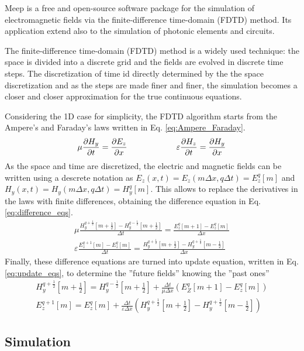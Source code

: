 Meep is a free and open-source software package for the simulation of electromagnetic fields via the finite-difference time-domain (FDTD) method.
Its application extend also to the simulation of photonic elements and circuits.  

The finite-difference time-domain (FDTD) method is a widely used technique: the space is divided into a discrete grid and the fields are evolved in discrete time steps.
The discretization of time id directly determined by the the space discretization and as the steps are made finer and finer, the simulation becomes a closer and closer approximation for the true continuous equations.

Considering the 1D case for simplicity, the FDTD algorithm starts from the Ampere's and Faraday's laws written in Eq. \ref*{eq:Ampere_Faraday}.
\begin{equation} \label{eq:Ampere_Faraday}
    \mu \pdv{H_y}{t} = \pdv{E_z}{x} \qquad\qquad\qquad \varepsilon \pdv{H_z}{t} = \pdv{H_y}{x}
\end{equation}
As the space and time are discretized, the electric and magnetic fields can be written using a descrete notation as \(E_z(x, t) = E_z (m\Delta x, q \Delta t) = E_z^q[m]\) and \(H_y(x, t) = H_y(m\Delta x, q \Delta t) = H_y^q[m]\). This allows to replace the derivatives in the laws with finite differences, obtaining the difference equation in Eq. \ref*{eq:difference_eqs}.
\begin{align}\label{eq:difference_eqs}
    \mu \frac{H_y^{q+\frac{1}{2}}[m+\frac{1}{2}] - H_y^{q-\frac{1}{2}}[m+\frac{1}{2}]}{\Delta t} = \frac{E_z^q[m+1] - E_z^q[m]}{\Delta x}
    \\
    \varepsilon\frac{E_z^{q+1}[m] - E_z^q[m]}{\Delta t} = \frac{H_y^{q+\frac{1}{2}}[m+\frac{1}{2}] - H_y^{q+\frac{1}{2}}[m-\frac{1}{2}]}{\Delta x}
\end{align}
Finally, these difference equations are turned into update equation, written in Eq. \ref*{eq:update_eqs}, to determine the ''future fields'' knowing the ''past ones''
\begin{align}\label{eq:update_eqs}
    H_y^{q+\frac{1}{2}} \left[ m+\frac{1}{2} \right] = H_y^{q-\frac{1}{2}} \left[ m+\frac{1}{2} \right] + \frac{\Delta t}{\mu \Delta x} \left( E_Z^q[m+1] - E_z^q[m] \right)
    \\
    E_z^{q+1} [m] = E_z^q[m] + \frac{\Delta t}{\varepsilon \Delta x} \left( H_y^{q+\frac{1}{2}}\left[ m+\frac{1}{2} \right] - H_y^{q+\frac{1}{2}}\left[ m-\frac{1}{2} \right] \right)
\end{align}

\subsection{Simulation}